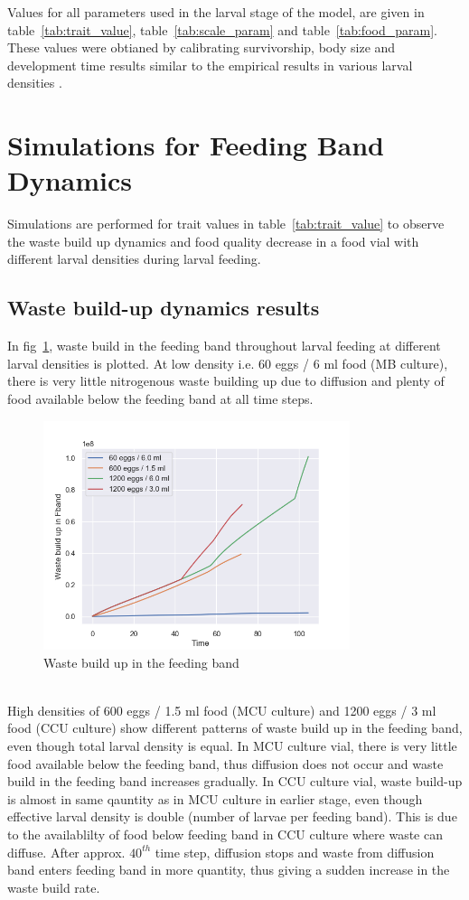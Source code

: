 \noindent Values for all parameters used in the larval stage of the model, are given in table~\ref{tab:trait_value}, table~\ref{tab:scale_param} and table~\ref{tab:food_param}. These values were obtianed by calibrating survivorship, body size and development time results similar to the empirical results in various larval densities \cite{sarangiPhD}.
\newpage
\section{Simulations for Feeding Band Dynamics}
Simulations are performed for trait values in table~\ref{tab:trait_value} to observe the waste build up dynamics and food quality decrease in a food vial with different larval densities during larval feeding.
\subsection{Waste build-up dynamics results}
In fig~\ref{fig:waste}, waste build in the feeding band throughout larval feeding at different larval densities is plotted. At low density i.e. 60 eggs / 6 ml food (MB culture), there is very little nitrogenous waste building up due to diffusion and plenty of food available below the feeding band at all time steps.
\begin{figure}[h]
  \centering
  \includegraphics[width=0.8\textwidth]{C2/Figs/waste_build_up}
  \caption{Waste build up in the feeding band}
  \label{fig:waste}
\end{figure}\\
\noindent High densities of 600 eggs / 1.5 ml food (MCU culture) and 1200 eggs / 3 ml food (CCU culture) show different patterns of waste build up in the feeding band, even though total larval density is equal. In MCU culture vial, there is very little food available below the feeding band, thus diffusion does not occur and waste build in the feeding band increases gradually. In CCU culture vial, waste build-up is almost in same qauntity as in MCU culture in earlier stage, even though effective larval density is double (number of larvae per feeding band). This is due to the availablilty of food below feeding band in CCU culture where waste can diffuse. After approx. $40^{th}$ time step, diffusion stops and waste from diffusion band enters feeding band in more quantity, thus giving a sudden increase in the waste build rate. \\

